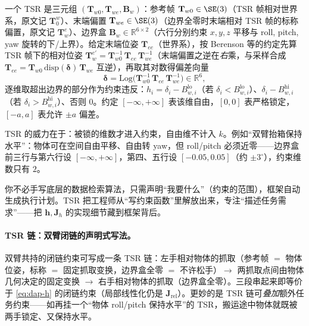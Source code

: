 \begin{definition}\label{def:dap-tsr}
一个 TSR 是三元组 $(\mathbf{T}_{w0},\mathbf{T}_{we},\mathbf{B}_w)$：参考帧 $\mathbf{T}_{w0}\in\SE(3)$（TSR 帧相对世界系，原文记 $\mathbf{T}^w_0$）、末端偏置 $\mathbf{T}_{we}\in\SE(3)$（边界全零时末端相对 TSR 帧的标称偏置，原文记 $\mathbf{T}^e_w$）、边界盒 $\mathbf{B}_w\in\mathbb{R}^{6\times2}$（六行分别约束 $x,y,z$ 平移与 roll, pitch, yaw 旋转的下/上界）。给定末端位姿 $\mathbf{T}_{ee}$（世界系），按 Berenson 等的约定先算 TSR 帧下的相对位姿 $\mathbf{T}_{w}^{e\prime}=\mathbf{T}_{w0}^{-1}\,\mathbf{T}_{ee}\,\mathbf{T}_{we}^{-1}$（末端偏置之逆在\emph{右}乘，与采样合成 $\mathbf{T}_{ee}=\mathbf{T}_{w0}\,\mathrm{disp}(\boldsymbol{\delta})\,\mathbf{T}_{we}$ 互逆），再取其对数得偏差向量
\begin{equation}
  \boldsymbol{\delta}=\mathrm{Log}\!\big(\mathbf{T}_{w0}^{-1}\,\mathbf{T}_{ee}\,\mathbf{T}_{we}^{-1}\big)\in\mathbb{R}^6,
  \label{eq:dap-tsr-delta}
\end{equation}
逐维取超出边界的部分作为约束违反：$h_i=\delta_i-B_{w,i}^{\text{lo}}$（若 $\delta_i<B_{w,i}^{\text{lo}}$）、$\delta_i-B_{w,i}^{\text{hi}}$（若 $\delta_i>B_{w,i}^{\text{hi}}$）、否则 $0$。约定 $[-\infty,+\infty]$ 表该维自由，$[0,0]$ 表严格锁定，$[-a,a]$ 表允许 $\pm a$ 偏差。
\end{definition}

TSR 的威力在于：被锁的维数才进入约束，自由维不计入 $k$。例如“双臂抬箱保持水平”：物体可在空间自由平移、自由转 yaw，但 roll/pitch 必须近零——边界盒前三行与第六行设 $[-\infty,+\infty]$，第四、五行设 $[-0.05,0.05]$（约 $\pm3^\circ$），约束维数只有 $2$。

\begin{insight}
你不必手写底层的数据检索算法，只需声明“我要什么”（约束的范围），框架自动生成执行计划。TSR 把工程师从“写约束函数”里解放出来，专注“描述任务需求”——把 $\mathbf{h},\mathbf{J}_h$ 的实现细节藏到框架背后。
\end{insight}

\paragraph{TSR 链：双臂闭链的声明式写法。}
双臂共持的闭链约束可写成一条 TSR 链：左手相对物体的抓取（参考帧 $=$ 物体位姿，标称 $=$ 固定抓取变换，边界盒全零 $=$ 不许松手）$\to$ 两抓取点间由物体几何决定的固定变换 $\to$ 右手相对物体的抓取（边界盒全零）。三段串起来即等价于 \cref{eq:dap-h} 的闭链约束（局部线性化仍是 $\mathbf{J}_{\text{rel}}$）。更妙的是 TSR 链可\emph{叠加}额外任务约束——如再挂一个“物体 roll/pitch 保持水平”的 TSR，搬运途中物体就既被两手锁定、又保持水平。

